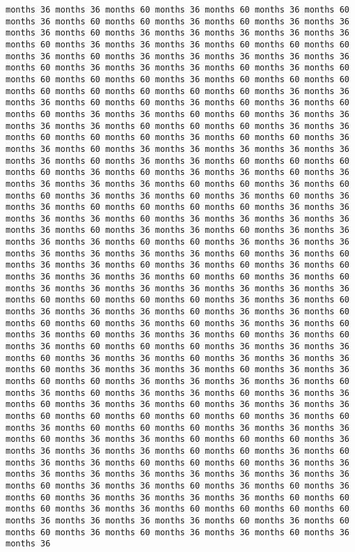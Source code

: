 \documentclass[11pt]{article}
\begin{document}
\begin{Verbatim}[commandchars=\\\{\}, frame=single, framerule=2mm, rulecolor=\color{outerrorbackground}]
months 36 months 36 months 60 months 36 months 60 months 36 months 60 months 36 months 60 months 60 months 36 months 60 months 36 months 36 months 36 months 60 months 36 months 36 months 36 months 36 months 36 months 60 months 36 months 36 months 36 months 60 months 60 months 60 months 36 months 60 months 36 months 36 months 36 months 36 months 36 months 60 months 36 months 36 months 36 months 60 months 36 months 60 months 60 months 60 months 60 months 36 months 60 months 60 months 60 months 60 months 60 months 60 months 60 months 60 months 36 months 36 months 36 months 60 months 60 months 36 months 60 months 36 months 60 months 60 months 36 months 36 months 60 months 60 months 36 months 36 months 36 months 36 months 60 months 60 months 60 months 36 months 36 months 60 months 60 months 60 months 36 months 60 months 60 months 36 months 36 months 60 months 36 months 36 months 36 months 36 months 36 months 36 months 60 months 36 months 36 months 60 months 60 months 60 months 60 months 36 months 60 months 36 months 36 months 60 months 36 months 36 months 36 months 36 months 60 months 60 months 36 months 60 months 60 months 36 months 36 months 60 months 36 months 60 months 36 months 36 months 60 months 60 months 60 months 60 months 36 months 36 months 36 months 36 months 60 months 36 months 36 months 36 months 36 months 36 months 60 months 36 months 36 months 60 months 36 months 36 months 36 months 36 months 60 months 60 months 36 months 36 months 36 months 36 months 36 months 36 months 36 months 60 months 36 months 60 months 36 months 36 months 60 months 36 months 60 months 36 months 60 months 36 months 36 months 36 months 60 months 60 months 36 months 60 months 36 months 36 months 36 months 36 months 36 months 36 months 36 months 60 months 60 months 60 months 60 months 36 months 36 months 60 months 36 months 36 months 36 months 60 months 36 months 36 months 60 months 60 months 60 months 36 months 60 months 36 months 36 months 60 months 36 months 60 months 36 months 36 months 60 months 36 months 60 months 36 months 60 months 60 months 60 months 36 months 36 months 36 months 60 months 36 months 36 months 60 months 36 months 36 months 36 months 60 months 36 months 36 months 36 months 60 months 36 months 36 months 60 months 60 months 36 months 36 months 36 months 36 months 60 months 36 months 60 months 36 months 36 months 60 months 36 months 36 months 60 months 36 months 36 months 60 months 36 months 36 months 36 months 60 months 60 months 60 months 60 months 60 months 36 months 60 months 36 months 60 months 60 months 60 months 36 months 36 months 36 months 60 months 36 months 36 months 60 months 60 months 60 months 36 months 36 months 36 months 36 months 60 months 60 months 36 months 60 months 36 months 36 months 60 months 60 months 60 months 36 months 36 months 36 months 36 months 36 months 36 months 36 months 36 months 36 months 60 months 36 months 36 months 60 months 36 months 60 months 36 months 60 months 36 months 36 months 36 months 36 months 60 months 60 months 60 months 36 months 36 months 60 months 60 months 60 months 60 months 36 months 36 months 36 months 36 months 60 months 36 months 60 months 60 months 36 months 60 months 36 months 36 months 60 months 36 months 36 
\end{Verbatim}
\end{document}
